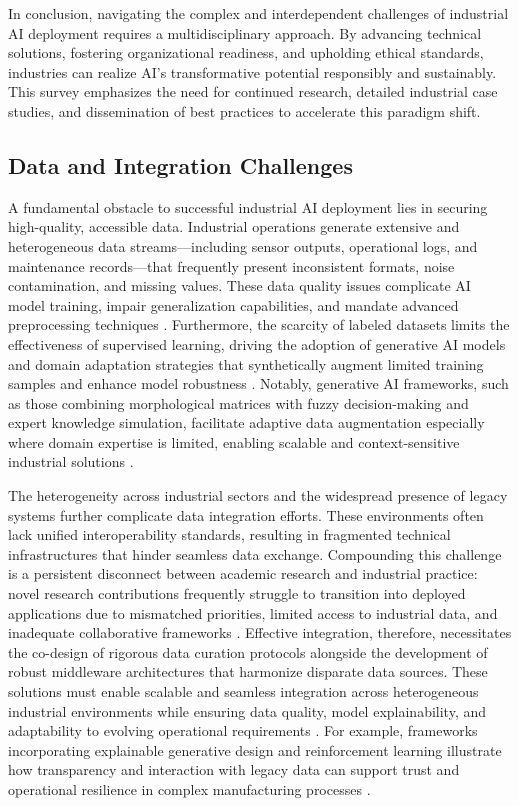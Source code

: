 \documentclass[sigconf]{acmart}
\begin{document}
In conclusion, navigating the complex and interdependent challenges of industrial AI deployment requires a multidisciplinary approach. By advancing technical solutions, fostering organizational readiness, and upholding ethical standards, industries can realize AI’s transformative potential responsibly and sustainably. This survey emphasizes the need for continued research, detailed industrial case studies, and dissemination of best practices to accelerate this paradigm shift.

\subsection{Data and Integration Challenges}

A fundamental obstacle to successful industrial AI deployment lies in securing high-quality, accessible data. Industrial operations generate extensive and heterogeneous data streams—including sensor outputs, operational logs, and maintenance records—that frequently present inconsistent formats, noise contamination, and missing values. These data quality issues complicate AI model training, impair generalization capabilities, and mandate advanced preprocessing techniques \cite{ref6,ref9}. Furthermore, the scarcity of labeled datasets limits the effectiveness of supervised learning, driving the adoption of generative AI models and domain adaptation strategies that synthetically augment limited training samples and enhance model robustness \cite{ref2,ref3}. Notably, generative AI frameworks, such as those combining morphological matrices with fuzzy decision-making and expert knowledge simulation, facilitate adaptive data augmentation especially where domain expertise is limited, enabling scalable and context-sensitive industrial solutions \cite{ref2}.

The heterogeneity across industrial sectors and the widespread presence of legacy systems further complicate data integration efforts. These environments often lack unified interoperability standards, resulting in fragmented technical infrastructures that hinder seamless data exchange. Compounding this challenge is a persistent disconnect between academic research and industrial practice: novel research contributions frequently struggle to transition into deployed applications due to mismatched priorities, limited access to industrial data, and inadequate collaborative frameworks \cite{ref3}. Effective integration, therefore, necessitates the co-design of rigorous data curation protocols alongside the development of robust middleware architectures that harmonize disparate data sources. These solutions must enable scalable and seamless integration across heterogeneous industrial environments while ensuring data quality, model explainability, and adaptability to evolving operational requirements \cite{ref6,ref9}. For example, frameworks incorporating explainable generative design and reinforcement learning illustrate how transparency and interaction with legacy data can support trust and operational resilience in complex manufacturing processes \cite{ref9}.
\end{document}
